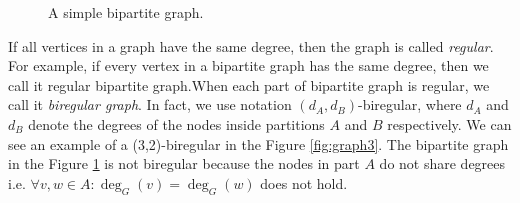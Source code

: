 \begin{figure}[h]
\centering
\caption{A simple bipartite graph.\label{fig:graph2}}
\end{figure}

If all vertices in a graph have the same degree, then the graph is called \emph{regular}.
For example, if every vertex in a bipartite graph has the same degree, then we call it regular bipartite graph.When each part of bipartite graph is regular, we call it \emph{biregular graph}.
In fact, we use notation $(d_A,d_B)$-biregular, where $d_A$ and $d_B$ denote the degrees of the nodes inside partitions $A$ and $B$ respectively.
We can see an example of a (3,2)-biregular in the Figure \ref{fig:graph3}.
The bipartite graph in the Figure \ref{fig:graph2} is not biregular because the nodes in part $A$ do not share degrees i.e. $\forall v, w \in A: \deg_G(v) = \deg_G(w)$ does not hold.

